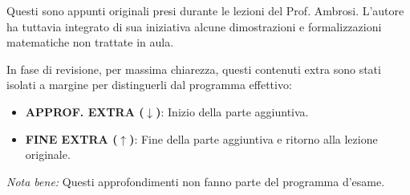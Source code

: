 \documentclass[italian]{HKNdocument}
\author{Davide Carbone (non facente parte di HKN)}
\begin{document}
\vspace*{1cm}
\begin{tcolorbox}[colback=gray!5, colframe=gray!40, arc=3pt, title={\textbf{Nota alla lettura}}]
Questi sono appunti originali presi durante le lezioni del Prof. Ambrosi. L'autore ha tuttavia integrato di sua iniziativa alcune dimostrazioni e formalizzazioni matematiche non trattate in aula.

In fase di revisione, per massima chiarezza, questi contenuti extra sono stati isolati a margine per distinguerli dal programma effettivo:

\begin{itemize}
    \item \textbf{APPROF. EXTRA ($\downarrow$)}: Inizio della parte aggiuntiva.
    \item \textbf{FINE EXTRA ($\uparrow$)}: Fine della parte aggiuntiva e ritorno alla lezione originale.
\end{itemize}

\textit{Nota bene:} Questi approfondimenti non fanno parte del programma d'esame.
\end{tcolorbox}
\vspace*{1cm}

















\end{document}
